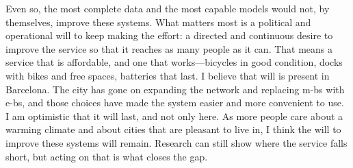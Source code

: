 Even so, the most complete data and the most capable models would not, by themselves, improve these systems. What matters most is a political and operational will to keep making the effort: a directed and continuous desire to improve the service so that it reaches as many people as it can. That means a service that is affordable, and one that works---bicycles in good condition, docks with bikes and free spaces, batteries that last. I believe that will is present in Barcelona. The city has gone on expanding the network and replacing \acp{m-b} with \acp{e-b}, and those choices have made the system easier and more convenient to use. I am optimistic that it will last, and not only here. As more people care about a warming climate and about cities that are pleasant to live in, I think the will to improve these systems will remain. Research can still show where the service falls short, but acting on that is what closes the gap.
